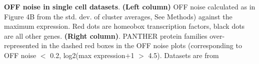 \textbf{OFF noise in single cell datasets}. \textbf{(Left column)} OFF noise calculated as in Figure 4B from the std. dev. of cluster averages, See Methods) against the maximum expression. Red dots are homeobox transcription factors, black dots are all other genes. \textbf{(Right column)}. PANTHER protein families over-represented in the dashed red boxes in the OFF noise plots (corresponding to OFF noise $<$ 0.2, log2(max expression$+$1 $>$ 4.5). Datasets are from \citep{Zeisel_2015; Tasic_2016; Zeisel_2018; Saunders_2018}